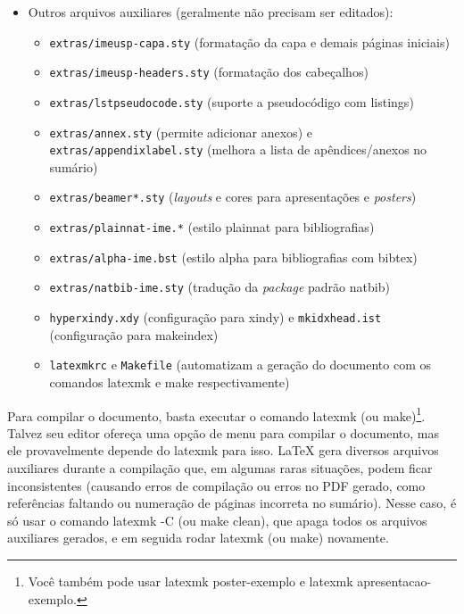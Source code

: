 \begin{itemize}
  \item Outros arquivos auxiliares (geralmente não precisam ser editados):
  \begin{itemize}
    \item \texttt{extras/imeusp-capa.sty} (formatação da capa e demais páginas iniciais)
    \item \texttt{extras/imeusp-headers.sty} (formatação dos cabeçalhos)
    \item \texttt{extras/lstpseudocode.sty} (suporte a pseudocódigo com \textsf{listings})
    \item \texttt{extras/annex.sty} (permite adicionar anexos) e
          \texttt{extras/appendixlabel.sty} (melhora a lista de
          apêndices/anexos no sumário)
    \item \texttt{extras/beamer*.sty} (\textit{layouts} e cores para
          apresentações e \textit{posters})
    \item \texttt{extras/plainnat-ime.*} (estilo plainnat para bibliografias)
    \item \texttt{extras/alpha-ime.bst} (estilo alpha para bibliografias com
          bibtex)
    \item \texttt{extras/natbib-ime.sty} (tradução da \textit{package}
          padrão natbib)
    \item \texttt{hyperxindy.xdy} (configuração para xindy) e
          \texttt{mkidxhead.ist} (configuração para makeindex)
    \item \texttt{latexmkrc} e \texttt{Makefile} (automatizam a geração do
          documento com os comandos \textsf{latexmk} e \textsf{make} respectivamente)
  \end{itemize}
\end{itemize}

Para compilar o documento, basta executar o comando \textsf{latexmk} (ou
\textsf{make})\footnote{Você também pode usar \textsf{latexmk poster-exemplo}
e \textsf{latexmk apresentacao-exemplo}.}. Talvez seu editor ofereça uma
opção de menu para compilar o documento, mas ele provavelmente depende do
\textsf{latexmk} para isso. \LaTeX{} gera diversos arquivos auxiliares
durante a compilação que, em algumas raras situações, podem ficar
inconsistentes (causando erros de compilação ou erros no PDF gerado, como
referências faltando ou numeração de páginas incorreta no sumário). Nesse
caso, é só usar o comando \textsf{latexmk -C} (ou \textsf{make clean}),
que apaga todos os arquivos auxiliares gerados, e em seguida rodar
\textsf{latexmk} (ou \textsf{make}) novamente.

